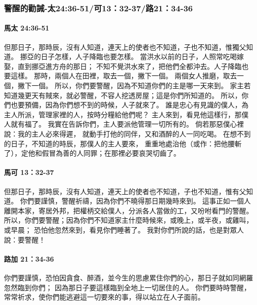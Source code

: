 \subsubsection{警醒的勸誡-太24:36-51/可13：32-37/路21：34-36}
\paragraph{馬太 24:36-51}
但那日子，那時辰，沒有人知道，連天上的使者也不知道，子也不知道，惟獨父知道。
挪亞的日子怎樣，人子降臨也要怎樣。
當洪水以前的日子，人照常吃喝嫁娶，直到挪亞進方舟的那日；
不知不覺洪水來了，把他們全都沖去。人子降臨也要這樣。
那時，兩個人在田裡，取去一個，撇下一個。
兩個女人推磨，取去一個，撇下一個。
所以，你們要警醒，因為不知道你們的主是哪一天來到。
家主若知道幾更天有賊來，就必警醒，不容人挖透房屋；這是你們所知道的。
所以，你們也要預備，因為你們想不到的時候，人子就來了。
誰是忠心有見識的僕人，為主人所派，管理家裡的人，按時分糧給他們呢？
主人來到，看見他這樣行，那僕人就有福了。
我實在告訴你們，主人要派他管理一切所有的。
倘若那惡僕心裡說：我的主人必來得遲，
就動手打他的同伴，又和酒醉的人一同吃喝。
在想不到的日子，不知道的時辰，那僕人的主人要來，
重重地處治他（或作：把他腰斬了），定他和假冒為善的人同罪；在那裡必要哀哭切齒了。

\paragraph{馬可 13：32-37}
但那日子，那時辰，沒有人知道，連天上的使者也不知道，子也不知道，惟有父知道。
你們要謹慎，警醒祈禱，因為你們不曉得那日期幾時來到。
這事正如一個人離開本家，寄居外邦，把權柄交給僕人，分派各人當做的工，又吩咐看門的警醒。
所以，你們要警醒；因為你們不知道家主什麼時候來，或晚上，或半夜，或雞叫，或早晨；
恐怕他忽然來到，看見你們睡著了。
我對你們所說的話，也是對眾人說：要警醒！

\paragraph{路加 21：34-36}
你們要謹慎，恐怕因貪食、醉酒，並今生的思慮累住你們的心，那日子就如同網羅忽然臨到你們；
因為那日子要這樣臨到全地上一切居住的人。
你們要時時警醒，常常祈求，使你們能逃避這一切要來的事，得以站立在人子面前。
